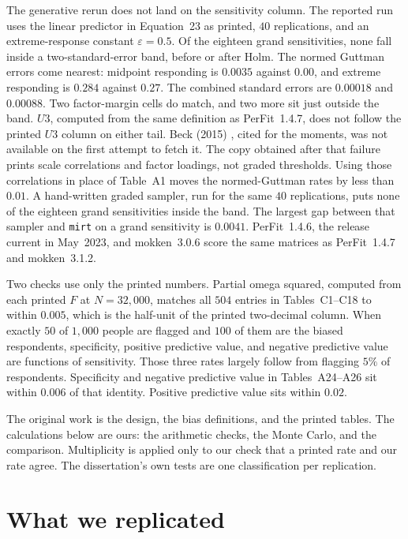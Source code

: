 \documentclass[11pt]{article}
\begin{document}
The generative rerun does not land on the sensitivity column.
The reported run uses the linear predictor in Equation~23 as printed,
\(40\) replications, and an extreme-response constant \(\varepsilon=0.5\).
Of the eighteen grand sensitivities, none fall inside a two-standard-error
band, before or after Holm.
The normed Guttman errors come nearest: midpoint responding is
\(0.0035\) against \(0.00\), and extreme responding is \(0.284\) against
\(0.27\).
The combined standard errors are \(0.00018\) and \(0.00088\).
Two factor-margin cells do match, and two more sit just outside the
band.
\(U3\), computed from the same definition as PerFit~1.4.7, does not
follow the printed \(U3\) column on either tail.
Beck (2015) \cite{beck2015}, cited for the moments, was not available
on the first attempt to fetch it.
The copy obtained after that failure prints scale correlations and
factor loadings, not graded thresholds.
Using those correlations in place of Table~A1 moves the normed-Guttman
rates by less than \(0.01\).
A hand-written graded sampler, run for the same \(40\) replications,
puts none of the eighteen grand sensitivities inside the band.
The largest gap between that sampler and \texttt{mirt} on a grand
sensitivity is \(0.0041\).
PerFit~1.4.6, the release current in May~2023, and mokken~3.0.6 score
the same matrices as PerFit~1.4.7 and mokken~3.1.2.

Two checks use only the printed numbers.
Partial omega squared, computed from each printed \(F\) at
\(N=32{,}000\), matches all \(504\) entries in Tables~C1--C18 to within
\(0.005\), which is the half-unit of the printed two-decimal column.
When exactly \(50\) of \(1{,}000\) people are flagged and \(100\) of them
are the biased respondents, specificity, positive predictive value, and
negative predictive value are functions of sensitivity.
Those three rates largely follow from flagging \(5\%\) of respondents.
Specificity and negative predictive value in Tables~A24--A26 sit within
\(0.006\) of that identity.
Positive predictive value sits within \(0.02\).

The original work is the design, the bias definitions, and the printed
tables.
The calculations below are ours: the arithmetic checks, the Monte Carlo,
and the comparison.
Multiplicity is applied only to our check that a printed rate and our
rate agree.
The dissertation's own tests are one classification per replication.

\section{What we replicated}
\label{sec:replicated}
\end{document}
